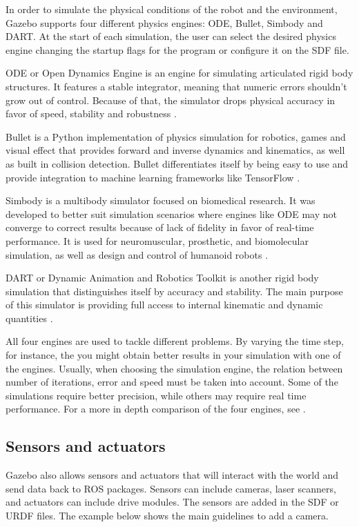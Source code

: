 In order to simulate the physical conditions of the robot and the environment, Gazebo supports four different physics engines: ODE, Bullet, Simbody and DART. At the start of each simulation, the user can select the desired physics engine changing the startup flags for the program or configure it on the SDF file.

ODE or Open Dynamics Engine is an engine for simulating articulated rigid body structures. It features a stable integrator, meaning that numeric errors shouldn't grow out of control. Because of that, the simulator drops physical accuracy in favor of speed, stability and robustness \cite{smith2005open}.

Bullet is a Python implementation of physics simulation for robotics, games and visual effect that provides forward and inverse dynamics and kinematics, as well as built in collision detection. Bullet differentiates itself by being easy to use and provide integration to machine learning frameworks like TensorFlow \cite{coumans2018}.

Simbody is a multibody simulator focused on biomedical research. It was developed to better suit simulation scenarios where engines like ODE may not converge to correct results because of lack of fidelity in favor of real-time performance. It is used for neuromuscular, prosthetic, and biomolecular simulation, as well as design and control of humanoid robots \cite{sherman2011simbody}.

DART or Dynamic Animation and Robotics Toolkit is another rigid body simulation that distinguishes itself by accuracy and stability. The main purpose of this simulator is providing full access to internal kinematic and dynamic quantities \cite{lee2018dart}.

All four engines are used to tackle different problems. By varying the time step, for instance, the you might obtain better results in your simulation with one of the engines. Usually, when choosing the simulation engine, the relation between number of iterations, error and speed must be taken into account. Some of the simulations require better precision, while others may require real time performance. For a more in depth comparison of the four engines, see \cite{peters2014comparison}.

\subsection{Sensors and actuators}

Gazebo also allows sensors and actuators that will interact with the world and send data back to ROS packages. Sensors can include cameras, laser scanners, and actuators can include drive modules. The sensors are added in the SDF or URDF files. The example below shows the main guidelines to add a camera.

